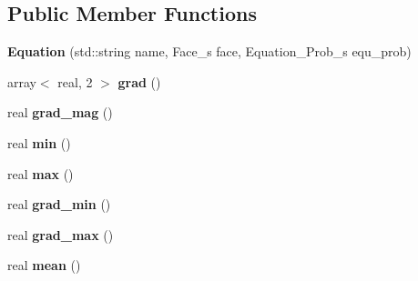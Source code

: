 \subsection*{Public Member Functions}
\begin{DoxyCompactItemize}
\item 
\hypertarget{classEquation_aa828f4c9f7a849e9ae29f2c9491863d6}{{\bfseries Equation} (std\-::string name, Face\-\_\-s face, Equation\-\_\-\-Prob\-\_\-s equ\-\_\-prob)}\label{classEquation_aa828f4c9f7a849e9ae29f2c9491863d6}

\item 
\hypertarget{classEquation_aaffdf465ebe87ee0c9932e62846f8986}{array$<$ real, 2 $>$ {\bfseries grad} ()}\label{classEquation_aaffdf465ebe87ee0c9932e62846f8986}

\item 
\hypertarget{classEquation_ab67fb5e35d95e74756aed668b072c03f}{real {\bfseries grad\-\_\-mag} ()}\label{classEquation_ab67fb5e35d95e74756aed668b072c03f}

\item 
\hypertarget{classEquation_a629f1ff3c54e7fcfe597c20ab49c773b}{real {\bfseries min} ()}\label{classEquation_a629f1ff3c54e7fcfe597c20ab49c773b}

\item 
\hypertarget{classEquation_a1e95e7d54591e5dc5c68ccca547101c5}{real {\bfseries max} ()}\label{classEquation_a1e95e7d54591e5dc5c68ccca547101c5}

\item 
\hypertarget{classEquation_a3a22bc1a6dd067b6feaf6fc6281a5c1f}{real {\bfseries grad\-\_\-min} ()}\label{classEquation_a3a22bc1a6dd067b6feaf6fc6281a5c1f}

\item 
\hypertarget{classEquation_ae2b284533eda56200c9122846623eb45}{real {\bfseries grad\-\_\-max} ()}\label{classEquation_ae2b284533eda56200c9122846623eb45}

\item 
\hypertarget{classEquation_ae0198edcc6a9a44ed7d88d8279f91cee}{real {\bfseries mean} ()}\label{classEquation_ae0198edcc6a9a44ed7d88d8279f91cee}

\end{DoxyCompactItemize}
